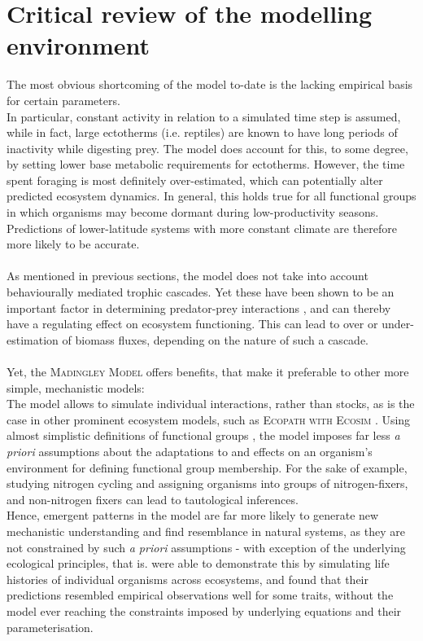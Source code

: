 \section{Critical review of the modelling environment}
The most obvious shortcoming of the model to-date is the lacking empirical basis for certain parameters. \\
In particular, constant activity in relation to a simulated time step is assumed, while in fact, large ectotherms (i.e. reptiles) are known to have long periods of inactivity while digesting prey. 
The model does account for this, to some degree, by setting lower base metabolic requirements for ectotherms. However, the time spent foraging is most definitely over-estimated, which can potentially alter predicted ecosystem dynamics. 
In general, this holds true for all functional groups in which organisms may become dormant during low-productivity seasons. Predictions of lower-latitude systems with more constant climate are therefore more likely to be accurate. \\\\
As mentioned in previous sections, the model does not take into account behaviourally mediated trophic cascades. Yet these have been shown to be an important factor in determining predator-prey interactions \citep[e.g][]{Fortin2005,Duffy2007,Beschta2009}, and can thereby have a regulating effect on ecosystem functioning. This can lead to over or under-estimation of biomass fluxes, depending on the nature of such a cascade.
\\\\
Yet, the \textsc{Madingley Model} offers benefits, that make it preferable to other more simple, mechanistic models:\\
The model allows to simulate individual interactions, rather than stocks, as is the case in other prominent ecosystem models, such as \textsc{Ecopath with Ecosim} \citep{Christensen2004}. Using almost simplistic definitions of functional groups , the model imposes far less \textit{a priori} assumptions about the adaptations to and effects on an organism's environment \citep[cf.][]{Hooper2002} for defining functional group membership. For the sake of example, studying nitrogen cycling and assigning organisms into groups of nitrogen-fixers, and non-nitrogen fixers can lead to tautological inferences.\\
 Hence, emergent patterns in the model are far more likely to generate new mechanistic understanding and find resemblance in natural systems, as they are not constrained by such \textit{a priori} assumptions - with exception of the underlying ecological principles, that is. \citep{Harfoot2014} were able to demonstrate this by simulating life histories of individual organisms across ecosystems, and found that their predictions resembled empirical observations well for some traits, without the model ever reaching the constraints imposed by underlying equations and their parameterisation. \\
